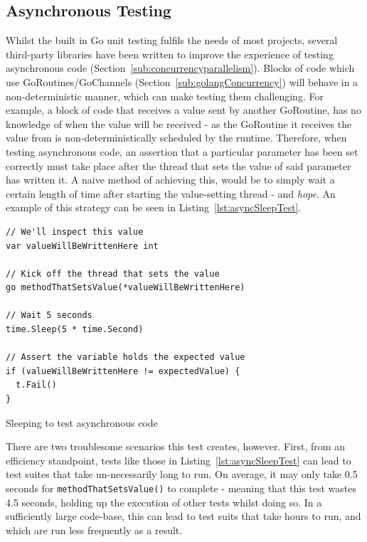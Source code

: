 \subsection{Asynchronous Testing}
\label{sub:asyncTesting}

Whilst the built in Go unit testing fulfils the needs of most projects, several
third-party libraries have been written to improve the experience of testing
asynchronous code (Section~\ref{sub:concurrencyparallelism}). Blocks of code
which use GoRoutines/GoChannels (Section~\ref{sub:golangConcurrency}) will
behave in a non-deterministic manner, which can make testing them challenging.
For example, a block of code that receives a value sent by another GoRoutine,
has no knowledge of when the value will be received - as the GoRoutine it
receives the value from is non-deterministically scheduled by the runtime.
Therefore, when testing asynchronous code, an assertion that a particular
parameter has been set correctly must take place after the thread that sets the
value of said parameter has written it. A naive method of achieving this, would
be to simply wait a certain length of time after starting the value-setting
thread - and \emph{hope}. An example of this strategy can be seen in
Listing~\ref{lst:asyncSleepTest}.

\begin{listing}[H]
  \centering
  \begin{verbatim}
// We'll inspect this value
var valueWillBeWrittenHere int

// Kick off the thread that sets the value
go methodThatSetsValue(*valueWillBeWrittenHere)

// Wait 5 seconds
time.Sleep(5 * time.Second)

// Assert the variable holds the expected value
if (valueWillBeWrittenHere != expectedValue) {
  t.Fail()
}
  \end{verbatim}
  \caption{Sleeping to test asynchronous code}
  \label{lst:asyncSleepTest}
\end{listing}

There are two troublesome scenarios this test creates, however. First, from an
efficiency standpoint, tests like those in Listing~\ref{lst:asyncSleepTest} can
lead to test suites that take un-necessarily long to run. On average, it may
only take 0.5 seconds for \texttt{methodThatSetsValue()} to complete -
meaning that this test wastes 4.5 seconds, holding up the execution of other
tests whilst doing so. In a sufficiently large code-base, this can lead to test
suits that take hours to run, and which are run less frequently as a result.

